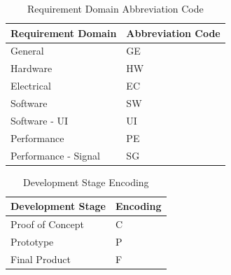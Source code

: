\bgroup
\def\arraystretch{1.5}
\begin{table}[H]
\centering
\begin{tabular}{ | m{7cm} | m{7cm}| } 
\hline
\textbf{Requirement Domain} & \textbf{Abbreviation Code} \\ 
\hline
General & GE\\ 
\hline
Hardware & HW\\ 
\hline
 Electrical & EC\\  
\hline
 Software & SW\\ 
\hline
 Software - UI & UI\\ 
\hline
 Performance & PE\\ 
\hline
Performance - Signal & SG\\ 
\hline
\end{tabular}
\caption{Requirement Domain Abbreviation Code}
\end{table}

\bgroup
\def\arraystretch{1.5}
\begin{table}[H]
\centering
\begin{tabular}{ | m{7cm} | m{7cm}| } 
\hline
\textbf{Development Stage} & \textbf{Encoding} \\ 
\hline
Proof of Concept & C\\ 
\hline
Prototype & P\\ 
\hline
Final Product & F\\  
\hline
\end{tabular}
\caption{Development Stage Encoding}
\end{table}	
	
	
	
%



















